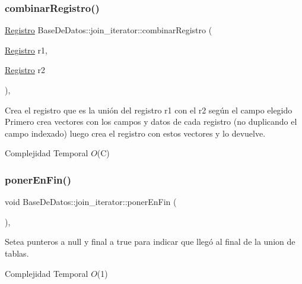 \subsubsection{\texorpdfstring{combinar\+Registro()}{combinarRegistro()}}
{\footnotesize\ttfamily \mbox{\hyperlink{classRegistro}{Registro}} Base\+De\+Datos\+::join\+\_\+iterator\+::combinar\+Registro (\begin{DoxyParamCaption}\item[{\mbox{\hyperlink{classRegistro}{Registro}}}]{r1,  }\item[{\mbox{\hyperlink{classRegistro}{Registro}}}]{r2 }\end{DoxyParamCaption})\hspace{0.3cm}{\ttfamily [inline]}, {\ttfamily [private]}}



Crea el registro que es la unión del registro r1 con el r2 según el campo elegido Primero crea vectores con los campos y datos de cada registro (no duplicando el campo indexado) luego crea el registro con estos vectores y lo devuelve. 


\begin{DoxyDescription}
\item[Complejidad Temporal]$O$(C)
\end{DoxyDescription}\mbox{\label{classBaseDeDatos_1_1join__iterator_a2f86621f116760476b8c1704af4b184f}} 
\subsubsection{\texorpdfstring{poner\+En\+Fin()}{ponerEnFin()}}
{\footnotesize\ttfamily void Base\+De\+Datos\+::join\+\_\+iterator\+::poner\+En\+Fin (\begin{DoxyParamCaption}{ }\end{DoxyParamCaption})\hspace{0.3cm}{\ttfamily [inline]}, {\ttfamily [private]}}



Setea punteros a null y final a true para indicar que llegó al final de la union de tablas. 


\begin{DoxyDescription}
\item[Complejidad Temporal]$O$(1)
\end{DoxyDescription}\mbox{\label{classBaseDeDatos_1_1join__iterator_a9aff1c7b280f0abcc05ffc4864a10ba5}} 
